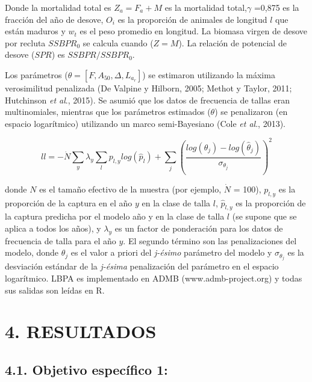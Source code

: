 \documentclass[
  spanish,
]{article}
\begin{document}
Donde la mortalidad total es \(Z_a=F_a+M\) es la mortalidad
total,\(\gamma\) =0,875 es la fracción del año de desove, \(O_i\) es la
proporción de animales de longitud \(l\) que están maduros y \(w_t\) es
el peso promedio en longitud. La biomasa virgen de desove por recluta
\(SSBPR_0\) se calcula cuando (\(Z = M\)). La relación de potencial de
desove (\(SPR\)) es \(SSBPR/SSBPR_0\).

Los parámetros (\(\theta = \left[F,A_{50},\Delta,L_{a_r}\right]\)) se
estimaron utilizando la máxima verosimilitud penalizada (De Valpine y
Hilborn, 2005; Methot y Taylor, 2011; Hutchinson \emph{et al}., 2015).
Se asumió que los datos de frecuencia de tallas eran multinomiales,
mientras que los parámetros estimados (\(\theta\)) se penalizaron (en
espacio logarítmico) utilizando un marco semi-Bayesiano (Cole \emph{et
al}., 2013).

\begin{equation}
ll=-\dot{N}\sum_{y}\lambda_y\sum_{l}p_{l,y}log(\hat{p}_l)+\sum_{j}\left(\frac{log(\theta_j)-log(\hat{\theta}_j)}{\sigma_{\theta_j}}\right)^2
\end{equation}

donde \(N\) es el tamaño efectivo de la muestra (por ejemplo,
\(\dot{N}\) = 100), \(p_{l,y}\) es la proporción de la captura en el año
\(y\) en la clase de talla \(l\), \(\hat{p}_{l,y}\) es la proporción de
la captura predicha por el modelo año y en la clase de talla \(l\) (se
supone que se aplica a todos los años), y \(\lambda_y\) es un factor de
ponderación para los datos de frecuencia de talla para el año \(y\). El
segundo término son las penalizaciones del modelo, donde \(\theta_j\) es
el valor a priori del \emph{j-ésimo} parámetro del modelo y
\(\sigma_{\theta_j}\) es la desviación estándar de la \emph{j-ésima}
penalización del parámetro en el espacio logarítmico. LBPA es
implementado en ADMB (www.admb-project.org) y todas sus salidas son
leídas en R.

\pagebreak
\normalsize

\hypertarget{resultados}{%
\section{4. RESULTADOS}\label{resultados}}

\hypertarget{objetivo-especuxedfico-1-1}{%
\subsection{4.1. Objetivo específico
1:}\label{objetivo-especuxedfico-1-1}}
\end{document}
